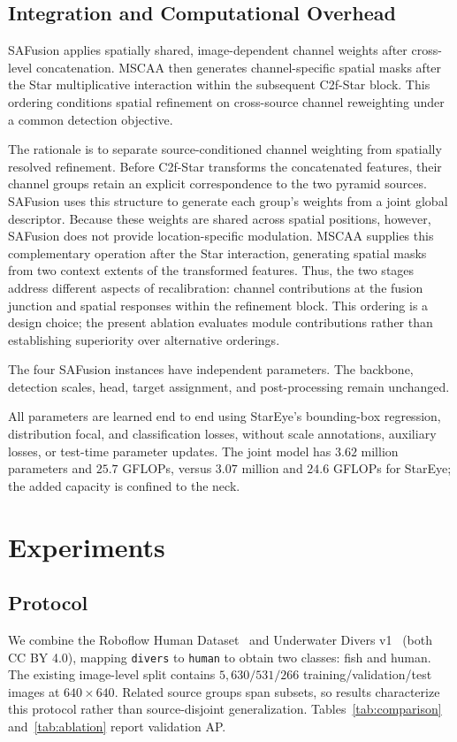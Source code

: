 \documentclass[letterpaper,10pt,conference]{ieeeconf}
\begin{document}
\subsection{Integration and Computational Overhead}
SAFusion applies spatially shared, image-dependent channel weights
after cross-level concatenation. MSCAA then generates channel-specific
spatial masks after the Star multiplicative interaction within the
subsequent C2f-Star block. This ordering conditions spatial refinement
on cross-source channel reweighting under a common detection objective.

The rationale is to separate source-conditioned channel weighting
from spatially resolved refinement. Before C2f-Star transforms the
concatenated features, their channel groups retain an explicit
correspondence to the two pyramid sources. SAFusion uses this structure
to generate each group's weights from a joint global descriptor.
Because these weights are shared across spatial positions, however,
SAFusion does not provide location-specific modulation. MSCAA supplies
this complementary operation after the Star interaction, generating
spatial masks from two context extents of the transformed features.
Thus, the two stages address different aspects of recalibration:
channel contributions at the fusion junction and spatial responses
within the refinement block. This ordering is a design choice;
the present ablation evaluates module contributions rather than
establishing superiority over alternative orderings.

The four SAFusion instances have independent parameters. The backbone,
detection scales, head, target assignment, and post-processing remain
unchanged.

All parameters are learned end to end using StarEye's bounding-box
regression, distribution focal, and classification losses, without
scale annotations, auxiliary losses, or test-time parameter updates.
The joint model has \(3.62\) million parameters and \(25.7\) GFLOPs,
versus \(3.07\) million and \(24.6\) GFLOPs for StarEye;
the added capacity is confined to the neck.

\section{Experiments}
\subsection{Protocol}
We combine the Roboflow Human Dataset~\cite{ref_human}
and Underwater Divers v1~\cite{ref_divers} (both CC BY 4.0),
mapping \texttt{divers} to \texttt{human} to obtain two classes:
fish and human. The existing image-level split contains \(5{,}630/531/266\)
training/validation/test images at \(640\times640\). Related source groups
span subsets, so results characterize this protocol rather than
source-disjoint generalization. Tables~\ref{tab:comparison}
and~\ref{tab:ablation} report validation AP.
\end{document}
